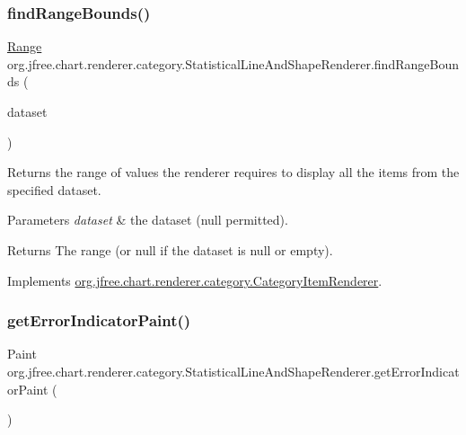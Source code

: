 \subsubsection{\texorpdfstring{find\+Range\+Bounds()}{findRangeBounds()}}
{\footnotesize\ttfamily \mbox{\hyperlink{classorg_1_1jfree_1_1data_1_1_range}{Range}} org.\+jfree.\+chart.\+renderer.\+category.\+Statistical\+Line\+And\+Shape\+Renderer.\+find\+Range\+Bounds (\begin{DoxyParamCaption}\item[{\mbox{\hyperlink{interfaceorg_1_1jfree_1_1data_1_1category_1_1_category_dataset}{Category\+Dataset}}}]{dataset }\end{DoxyParamCaption})}

Returns the range of values the renderer requires to display all the items from the specified dataset.


\begin{DoxyParams}{Parameters}
{\em dataset} & the dataset ({\ttfamily null} permitted).\\
\hline
\end{DoxyParams}
\begin{DoxyReturn}{Returns}
The range (or {\ttfamily null} if the dataset is {\ttfamily null} or empty). 
\end{DoxyReturn}


Implements \mbox{\hyperlink{interfaceorg_1_1jfree_1_1chart_1_1renderer_1_1category_1_1_category_item_renderer_aa7294c25a26ffd1725d7920a6041a785}{org.\+jfree.\+chart.\+renderer.\+category.\+Category\+Item\+Renderer}}.

\mbox{\label{classorg_1_1jfree_1_1chart_1_1renderer_1_1category_1_1_statistical_line_and_shape_renderer_ab44c842ea85e2436b2d32698acc19555}} 
\subsubsection{\texorpdfstring{get\+Error\+Indicator\+Paint()}{getErrorIndicatorPaint()}}
{\footnotesize\ttfamily Paint org.\+jfree.\+chart.\+renderer.\+category.\+Statistical\+Line\+And\+Shape\+Renderer.\+get\+Error\+Indicator\+Paint (\begin{DoxyParamCaption}{ }\end{DoxyParamCaption})}


